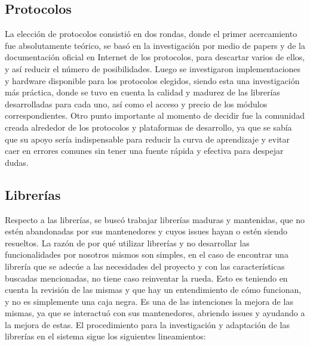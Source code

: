 \subsection{Protocolos}
La elección de protocolos consistió en dos rondas, donde el primer acercamiento fue absolutamente teórico, se basó en la investigación por medio de papers y de la documentación oficial en Internet de los protocolos, para descartar varios de ellos, y así reducir el número de posibilidades.
Luego se investigaron implementaciones y hardware disponible para los protocolos elegidos, siendo esta una investigación más práctica, donde se tuvo en cuenta la calidad y madurez de las librerías desarrolladas para cada uno, así como el acceso y precio de los módulos correspondientes. Otro punto importante al momento de decidir fue la comunidad creada alrededor de los protocolos y plataformas de desarrollo, ya que se sabía que su apoyo sería indispensable para reducir la curva de aprendizaje y evitar caer en errores comunes sin tener una fuente rápida y efectiva para despejar dudas.

\subsection{Librerías}

Respecto a las librerías, se buscó trabajar librerías maduras y mantenidas, que no estén abandonadas por sus mantenedores y cuyos issues hayan o estén siendo resueltos.
La razón de por qué utilizar librerías y no desarrollar las funcionalidades por nosotros mismos son simples, en el caso de encontrar una librería que se adecúe a las necesidades del proyecto y con las características buscadas mencionadas, no tiene caso reinventar la rueda. Esto es teniendo en cuenta la revisión de las mismas y que hay un entendimiento de cómo funcionan, y no es simplemente una caja negra. Es una de las intenciones la mejora de las mismas, ya que se interactuó con sus mantenedores, abriendo issues y ayudando a la mejora de estas.
El procedimiento para la investigación y adaptación de las librerías en el sistema sigue los siguientes lineamientos:

